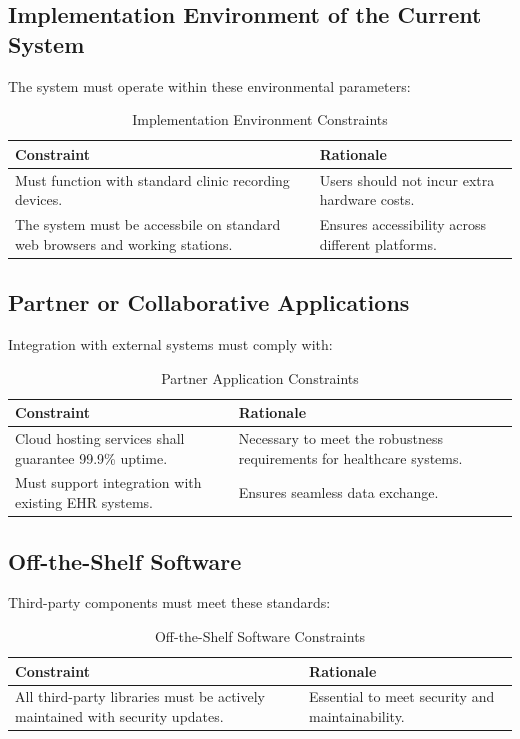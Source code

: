 \documentclass[12pt]{article}
\begin{document}
\subsection{Implementation Environment of the Current System}
The system must operate within these environmental parameters:

\begin{table}[H]
\centering
\begin{tabular}{|p{6cm}|p{6cm}|}
\hline
\textbf{Constraint} & \textbf{Rationale} \\
\hline
Must function with standard clinic recording devices. & Users should not incur extra hardware costs. \\
\hline
The system must be accessbile on standard web browsers and working stations. & Ensures accessibility across different platforms. \\
\hline
\end{tabular}
\caption{Implementation Environment Constraints}
\label{tab:implementation_constraints}
\end{table}

\subsection{Partner or Collaborative Applications}
Integration with external systems must comply with:

\begin{table}[H]
\centering
\begin{tabular}{|p{6cm}|p{6cm}|}
\hline
\textbf{Constraint} & \textbf{Rationale} \\
\hline
Cloud hosting services shall guarantee 99.9\% uptime. & Necessary to meet the robustness requirements for healthcare systems. \\
\hline
Must support integration with existing EHR systems. & Ensures seamless data exchange. \\
\hline
\end{tabular}
\caption{Partner Application Constraints}
\label{tab:partner_constraints}
\end{table}

\subsection{Off-the-Shelf Software}
Third-party components must meet these standards:

\begin{table}[H]
\centering
\begin{tabular}{|p{6cm}|p{6cm}|}
\hline
\textbf{Constraint} & \textbf{Rationale} \\
\hline
All third-party libraries must be actively maintained with security updates. & Essential to meet security and maintainability. \\
\hline
\end{tabular}
\caption{Off-the-Shelf Software Constraints}
\label{tab:off_the_shelf_constraints}
\end{table}
\end{document}
